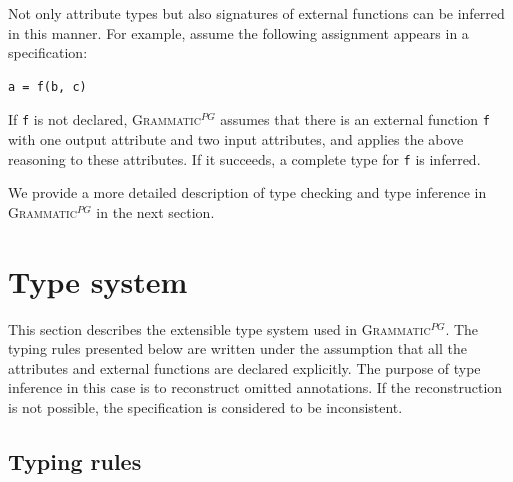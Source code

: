 \documentclass{llncs2e/llncs}
\newcommand{\ATF}{\textsc{Grammatic}$^{PG}$}
\begin{document}
{Not only attribute types but also signatures of external functions can be inferred in this manner. For example, assume the following assignment appears in a specification:
\begin{lstlisting}
a = f(b, c)
\end{lstlisting}
If \texttt{f} is not declared, \ATF{} assumes that there is an external function \texttt{f} with one output attribute and two input attributes, and applies the above reasoning to these attributes. If it succeeds, a complete type for \texttt{f} is inferred.

We provide a more detailed description of type checking and type inference in \ATF{} in the next section.

}

\section{Type system}\label{TypeSystem}

This section describes the extensible type system used in \ATF{}. The typing rules presented below are written under the assumption that all the attributes and external functions are declared explicitly. The purpose of type inference in this case is to reconstruct omitted annotations. If the reconstruction is not possible, the specification is considered to be inconsistent.

\subsection{Typing rules}

\newcommand{\G}{ {\mathcal{G}_L} }
\renewcommand{\L}{L}
\newcommand{\eql}{\cong_\L}
\newcommand{\lel}{\le_\L}
\newcommand{\gel}{\ge_\L}
\newcommand{\TUP}{TupleType}
\newcommand{\Str}{String_\L}
\end{document}
